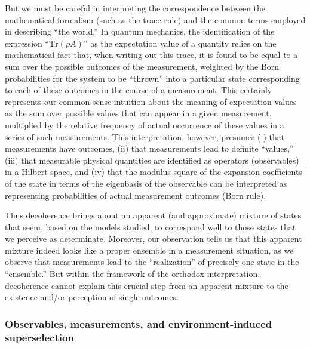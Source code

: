 \documentclass[twocolumn,rmp,aps,amsmath,amsfonts,noshowkeys,noshowpacs]{revtex4}
\begin{document}
But we must be careful in interpreting the correspondence between the
mathematical formalism (such as the trace rule) and the common terms
employed in describing ``the world.'' In quantum mechanics, the
identification of the expression ``$\text{Tr}(\rho A)$'' as the
expectation value of a quantity relies on the mathematical fact that,
when writing out this trace, it is found to be equal to a sum over the
possible outcomes of the measurement, weighted by the Born
probabilities for the system to be ``thrown'' into a particular state
corresponding to each of these outcomes in the course of a
measurement. This certainly represents our common-sense intuition
about the meaning of expectation values as the sum over possible
values that can appear in a given measurement, multiplied by the
relative frequency of actual occurrence of these values in a series of
such measurements. This interpretation, however, presumes (i) that
measurements have outcomes, (ii) that measurements lead to definite
``values,'' (iii) that measurable physical quantities are identified as
operators (observables) in a Hilbert space, and (iv) that the modulus
square of the expansion coefficients of the state in terms of the
eigenbasis of the observable can be interpreted as representing
probabilities of actual measurement outcomes (Born rule).

Thus decoherence brings about an apparent (and approximate) mixture of
states that seem, based on the models studied, to correspond well to
those states that we perceive as determinate.  Moreover, our
observation tells us that this apparent mixture indeed looks like a
proper ensemble in a measurement situation, as we observe that
measurements lead to the ``realization'' of precisely one state in the
``ensemble.''  But within the framework of the orthodox
interpretation, decoherence cannot explain this crucial step from an
apparent mixture to the existence and/or perception of single
outcomes.


\subsubsection{Observables, measurements, and environment-induced superselection}
\end{document}
